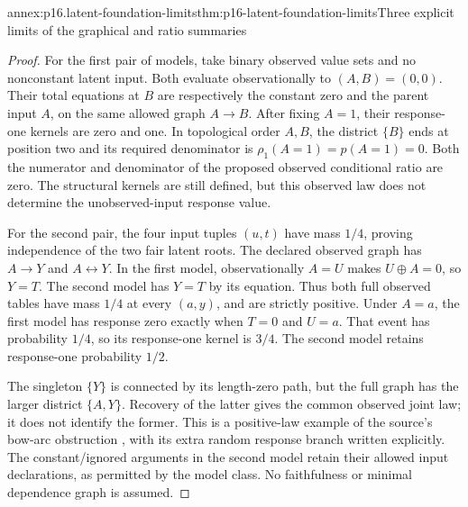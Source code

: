 \begin{annexitem}{annex:p16.latent-foundation-limits}{thm:p16-latent-foundation-limits}{Three explicit limits of the graphical and ratio summaries}
\begin{proof}
For the first pair of models, take binary observed value sets and
no nonconstant latent input. Both evaluate observationally to
\((A,B)=(0,0)\). Their total equations at \(B\) are respectively
the constant zero and the parent input \(A\), on the same allowed
graph \(A\to B\). After fixing \(A=1\), their response-one
kernels are zero and one. In topological order \(A,B\), the
district \(\{B\}\) ends at position two and its required
denominator is \(\rho_1(A=1)=p(A=1)=0\). Both the numerator
and denominator of the proposed observed conditional ratio are zero.
The structural kernels are still defined, but this observed law
does not determine the unobserved-input response value.

For the second pair, the four input tuples \((u,t)\) have mass
\(1/4\), proving independence of the two fair latent roots.
The declared observed graph has \(A\to Y\) and
\(A\leftrightarrow Y\). In the first model, observationally
\(A=U\) makes \(U\oplus A=0\), so \(Y=T\). The second
model has \(Y=T\) by its equation. Thus both full observed
tables have mass \(1/4\) at every \((a,y)\), and are strictly
positive. Under \(A=a\), the first model has response zero
exactly when \(T=0\) and \(U=a\). That event has probability
\(1/4\), so its response-one kernel is \(3/4\). The second
model retains response-one probability \(1/2\).

The singleton \(\{Y\}\) is connected by its length-zero path,
but the full graph has the larger district \(\{A,Y\}\).
Recovery of the latter gives the common observed joint law; it
does not identify the former. This is a positive-law example of
the source's bow-arc obstruction
\cite[Theorem~2, p.~1221]{ShpitserPearl2006JointIdentification},
with its extra random response branch written explicitly. The
constant/ignored arguments in the second model retain their allowed
input declarations, as permitted by the model class. No faithfulness
or minimal dependence graph is assumed.


\end{proof}
\end{annexitem}
